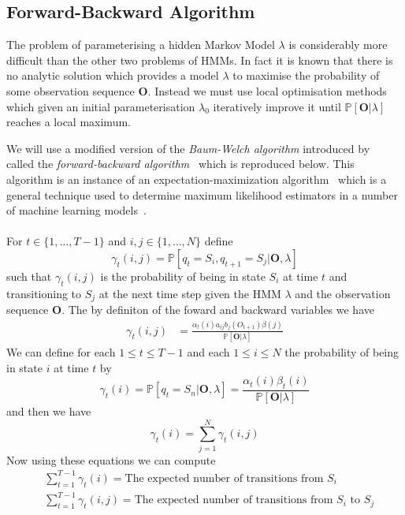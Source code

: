 \subsection{Forward-Backward Algorithm}
The problem of parameterising a hidden Markov Model $\lambda$ is considerably more difficult than the other two problems of HMMs. In fact it is known that there is no analytic solution which provides a model $\lambda$ to maximise the probability of some observation sequence $\bm{O}$. Instead we must use local optimisation methods which given an initial parameterisation $\lambda_0$ iteratively improve it until $\mathbb{P}[\bm{O} | \lambda]$ reaches a local maximum. 

We will use a modified version of the \emph{Baum-Welch algorithm} introduced by~\citet{baum1970maximization} called the \emph{forward-backward algorithm}~\citep{rabiner1989tutorial} which is reproduced below. This algorithm is an instance of an expectation-maximization algorithm~\cite{moon1996expectation} which is a general technique used to determine maximum likelihood estimators in a number of machine learning models~\cite{bishop2006pattern}. \\
\\
For $t \in \{1, \dots, T-1\}$ and $i,j \in \{1, \dots, N\}$ define
\begin{equation*}
\gamma_t(i,j) = \mathbb{P}[q_t = S_i, q_{t+1}=S_j| \bm{O}, \lambda]
\end{equation*}
such that $\gamma_t(i,j)$ is the probability of being in state $S_i$ at time $t$ and transitioning to $S_j$ at the next time step given the HMM $\lambda$ and the observation sequence $\bm{O}$. The by definiton of the foward and backward variables we have
\begin{align*}
\gamma_t(i,j) &= \frac{\alpha_t(i)a_{ij}b_j(O_{t+1})\beta(j)}{\mathbb{P}[\bm{O}|\lambda]}	
\end{align*}
We can define for each $1 \leq t \leq T-1$ and each $1 \leq i \leq N$ the probability of being in state $i$ at time $t$ by
\begin{equation*}
\gamma_t(i) = \mathbb{P}[q_t = S_n | \bm{O}, \lambda] = \frac{\alpha_t(i)\beta_t(i)}{\mathbb{P}[\bm{O}|\lambda]}
\end{equation*}
and then we have
\begin{equation*}
\gamma_t(i) = \sum_{j=1}^N \gamma_t(i,j)
\end{equation*}
Now using these equations we can compute
\begin{align*}
&\sum_{t=1}^{T-1} \gamma_t(i) = \text{The expected number of transitions from $S_i$} \\
&\sum_{t=1}^{T-1} \gamma_t(i,j) =  \text{The expected number of transitions from $S_i$ to $S_j$}\\
\end{align*}
